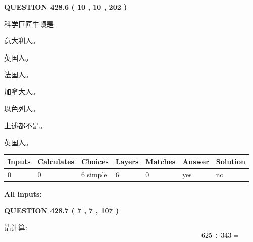 \documentclass{ctexart}
\begin{document}
   
  
\vspace{0.2in}
  
{\textbf{\Large{QUESTION
428.6 
 ( 10 , 10 , 202 )
}}}
  
  
科学巨匠牛顿是
 
 
意大利人。
 
 
英国人。
 
 
法国人。
 
 
加拿大人。
 
 
以色列人。
 
 
 上述都不是。
 
 
\noindent{}
 
 
英国人。
 
 
\noindent{}
 
 
   
   
   
   
\noindent\begin{tabular}{|l|l|l|l|l|l|l|}
 \hline
Inputs & Calculates & Choices & Layers & Matches & Answer & Solution \\ \hline
 0  & 
 0  & 
 6
  simple  
  & 
 6  & 
 0  & 
  yes & 
  no 
  \\ \hline
 \end{tabular}
   
   
   
   
\noindent{}
   
   
   
   
\noindent\vspace{0.1in}\hspace{-0.08in} {\textbf{\Large{All inputs: }}}
   
   
  
\vspace{0.2in}
  
{\textbf{\Large{QUESTION
428.7 
 ( 7 , 7 , 107 )
}}}
  
  
 
请计算:
\begin{equation}
625  \div    %
343 = \nonumber
\end{equation}
 
\end{document}
